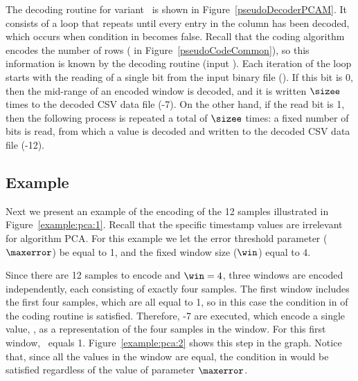 The decoding routine for variant \maskalgo\ is shown in Figure~\ref{pseudoDecoderPCAM}. It consists of a loop that repeats until every entry in the column has been decoded, which occurs when condition in  becomes false. Recall that the coding algorithm encodes the number of rows ( in Figure~\ref{pseudoCodeCommon}), so this information is known by the decoding routine (input \colSize). Each iteration of the loop starts with the reading of a single bit from the input binary file (). If this bit is 0, then the mid-range of an encoded window is decoded, and it is written $\sizee$ times to the decoded CSV data file (-7). On the other hand, if the read bit is 1, then the following process is repeated a total of $\sizee$ times: a fixed number of bits is read, from which a value is decoded and written to the decoded CSV data file (-12).


\clearpage





\vspace{+20pt}



\clearpage




\subsection{Example}
\label{algo:pca:example}
\newcommand{\exampleRecallIrrelevant}[1]{Recall that the specific timestamp values are irrelevant for algorithm #1}


Next we present an example of the encoding of the 12 samples illustrated in Figure~\ref{example:pca:1}. \exampleRecallIrrelevant{PCA}. For this example we let the error threshold parameter ($\maxerror$) be equal to 1, and the fixed window size ($\win$) equal to 4.


\vspace{+5pt}


Since there are 12 samples to encode and $\win=4$, three windows are encoded independently, each consisting of exactly four samples. The first window includes the first four samples, which are all equal to 1, so in this case the condition in  of the coding routine is satisfied. Therefore, -7 are executed, which encode a single value, \midrange, as a representation of the four samples in the window. For this first window, \midrange\ equals 1. Figure~\ref{example:pca:2} shows this step in the graph. Notice that, since all the values in the window are equal, the condition in  would be satisfied regardless of the value of parameter $\maxerror$.


